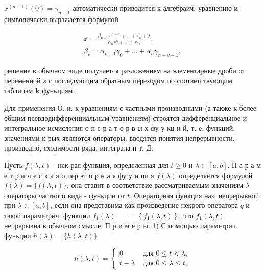 \documentclass[10pt]{article}
\begin{document}
$x^{(n-1)}(0)=\gamma_{n-1}$ автоматически приводится к алгебраич. уравнению и символически выражается формулой



\[

\begin{gathered}

x=\frac{\beta_{n-1} s^{n-1}+\ldots+\beta_{0}+f}{\alpha_{n} s^{n}+\ldots+\alpha_{0}}, \\

\beta_{v}=\alpha_{v+1} \gamma_{0}+\ldots+\alpha_{n} \gamma_{n-v-1},

\end{gathered}

\]



решение в обычном виде получается разложением на элементарные дроби от переменной $s$ с последующим обратным переходом по соответствующим таблицам $\boldsymbol{k}$ функциям.



Для применения О. и. к уравнениям с частными производными (а также к более общим псевдодифференциальным уравнениям) строятся дифференциальное и интегральное исчисления о п е р а т о р в ы х фу у кц и й, т. е. функций, значениями к-рых являются операторы: вводятся понятия непрерывности, производнӧ̈, сходимости ряда, интеграла и т. Д.



Пусть $f(\lambda, t)$ - нек-рая функция, определенная для $t \geqslant 0$ и $\lambda \in[a, b]$. П а р а м е т р и ч е с к а я о пер ат о р н а я фу у н ци я $f(\lambda)$ определяется формулой $f(\lambda)=\{f(\lambda, t)\}$; она ставит в соответствие рассматриваемым значениям $\lambda$ операторы частного вида - функции от $t$. Операторная функция наз. непрерывной при $\lambda \in[a, b]$, если она представима как произведение некрого оператора $q$ и такой параметрич. функции $f_{1}(\lambda)=$ $=\left\{f_{1}(\lambda, t)\right\}$, что $f_{1}(\lambda, t)$ непрерывна в обычном смысле. П р и м е р ы. 1) С помощью параметрич. функции $h(\lambda)=\{h(\lambda, t)\}$



\[

h(\lambda, t)=\left\{\begin{array}{cl}

0 & \text { для } 0 \leqslant t<\lambda, \\

t-\lambda & \text { для } 0 \leqslant \lambda \leqslant t,

\end{array}\right.

\]
\end{document}
